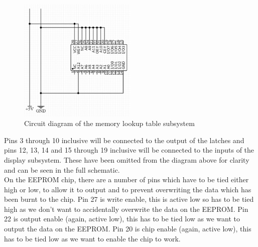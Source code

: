 \begin{figure}[H]
    \centering
    \includegraphics[width=0.5\textwidth]{images/eepromCircuitDiagram.jpg}
    \caption{Circuit diagram of the memory lookup table subsystem}
    \label{fig:eepromCircuitDiagram}
\end{figure}
\noindent Pins 3 through 10 inclusive will be connected to the output of the latches and pins 12, 13, 14 and 15 through 19 inclusive will be connected to the inputs of the display subsystem. These have been omitted from the diagram above for clarity and can be seen in the full schematic.\\
On the EEPROM chip, there are a number of pins which have to be tied either high or low, to allow it to output and to prevent overwriting the data which has been burnt to the chip. Pin 27 is write enable, this is active low so has to be tied high as we don't want to accidentally overwrite the data on the EEPROM. Pin 22 is output enable (again, active low), this has to be tied low as we want to output the data on the EEPROM. Pin 20 is chip enable (again, active low), this has to be tied low as we want to enable the chip to work.
